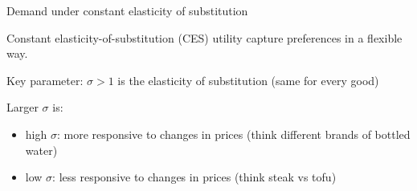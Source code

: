\documentclass[notes,11pt, aspectratio=169, xcolor=table]{beamer}
\newenvironment{wideitemize}{\itemize\addtolength{\itemsep}{10pt}}{\enditemize}
\begin{document}
\begin{frame}{Demand under constant elasticity of substitution}

\begin{wideitemize}
            \item Constant elasticity-of-substitution (CES) utility capture preferences in a flexible way.

            \item<2-> Key parameter:  $\sigma > 1$ is the elasticity of substitution (same for every good)
            
            \item<3-> Larger $\sigma$ is:
            \begin{itemize}
                \item high $\sigma$: more responsive to changes in prices (think different brands of bottled water) 
                \item low $\sigma$: less responsive to changes in prices (think steak vs tofu)
            \end{itemize}


\end{wideitemize}
    
\end{frame}
\end{document}
